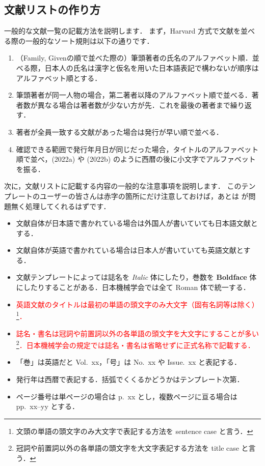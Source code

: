 \subsection{文献リストの作り方}
\label{ssec:bib_list}

一般的な文献一覧の記載方法を説明します．
まず，Harvard 方式で文献を並べる際の一般的なソート規則は以下の通りです．
\begin{tcolorbox}[enhanced, title={文献ソート規則}, drop fuzzy shadow]
    \begin{enumerate}
        \item （Family, Givenの順で並べた際の）筆頭著者の氏名のアルファベット順．並べる際，日本人の氏名は漢字と仮名を用いた日本語表記で構わないが順序はアルファベット順とする．
        \item 筆頭著者が同一人物の場合，第二著者以降のアルファベット順で並べる．著者数が異なる場合は著者数が少ない方が先．これを最後の著者まで繰り返す．
        \item 著者が全員一致する文献があった場合は発行が早い順で並べる．
        \item 確認できる範囲で発行年月日が同じだった場合，タイトルのアルファベット順で並べ，(2022a) や (2022b) のように西暦の後に小文字でアルファベットを振る．
    \end{enumerate}
\end{tcolorbox}
次に，文献リストに記載する内容の一般的な注意事項を説明します．
このテンプレートのユーザーの皆さんは赤字の箇所にだけ注意しておけば，あとは \BibTeX が問題無く処理してくれるはずです．
\begin{tcolorbox}[enhanced, title={文献リスト作成の注意事項}, drop fuzzy shadow]
    \begin{itemize}
        \item 文献自体が日本語で書かれている場合は外国人が書いていても日本語文献とする．
        \item 文献自体が英語で書かれている場合は日本人が書いていても英語文献とする．
        \item 文献テンプレートによっては誌名を \textit{Italic} 体にしたり，巻数を \textbf{Boldface} 体にしたりすることがある．日本機械学会では全て Roman 体で統一する．
        \item \textcolor{red}{英語文献のタイトルは最初の単語の頭文字のみ大文字（固有名詞等は除く）\footnote{文頭の単語の頭文字のみ大文字で表記する方法を sentence case と言う．}．}
        \item \textcolor{red}{誌名・書名は冠詞や前置詞以外の各単語の頭文字を大文字にすることが多い\footnote{冠詞や前置詞以外の各単語の頭文字を大文字表記する方法を title case と言う．}．日本機械学会の規定では誌名・書名は省略せずに正式名称で記載する．}
        \item 「巻」は英語だと Vol.~xx，「号」は No.~xx や Issue.~xx と表記する．
        \item 発行年は西暦で表記する．括弧でくくるかどうかはテンプレート次第．
        \item ページ番号は単ページの場合は p.~xx とし，複数ページに亘る場合は pp.~xx--yy とする．
    \end{itemize}
\end{tcolorbox}

